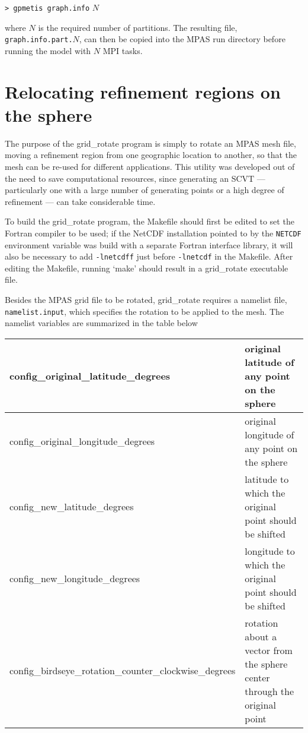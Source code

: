 \vspace{12pt}
{\tt > gpmetis graph.info} $N$
\vspace{12pt}

\noindent where $N$ is the required number of partitions. The resulting file, {\tt graph.info.part.}$N$, 
can then be copied into the MPAS run directory before running the model with $N$ MPI tasks.


\section{Relocating refinement regions on the sphere}
\label{sec:grid_rotate} 

The purpose of the grid\_rotate program is simply to rotate an MPAS mesh file,
moving a refinement region from one geographic location to another, so that the
mesh can be re-used for different applications. This utility was developed out
of the need to save computational resources, since generating an SCVT ---
particularly one with a large number of generating points or a high degree of
refinement --- can take considerable time.

To build the grid\_rotate program, the Makefile should first be edited to set
the Fortran compiler to be used; if the NetCDF installation pointed to by the
{\tt NETCDF} environment variable was build with a separate Fortran interface
library, it will also be necessary to add {\tt -lnetcdff} just before {\tt -lnetcdf} in 
the Makefile. After editing the Makefile, running `make' should
result in a grid\_rotate executable file.

Besides the MPAS grid file to be rotated, grid\_rotate requires a namelist file,
{\tt namelist.input}, which specifies the rotation to be applied to the mesh.
The namelist variables are summarized in the table below
   
\vspace{12pt}
\begin{longtable}{|p{3.25in} |p{2.5in}|}
\hline
config\_original\_latitude\_degrees & original latitude of any point on the sphere \\ \hline
config\_original\_longitude\_degrees & original longitude of any point on the sphere \\ \hline
config\_new\_latitude\_degrees &  latitude to which the original point should be shifted \\ \hline
config\_new\_longitude\_degrees &  longitude to which the original point should be shifted \\ \hline
config\_birdseye\_rotation\_counter\_clockwise\_degrees & rotation about a vector from the sphere center through the original point \\ \hline
\end{longtable}
\vspace{12pt}


